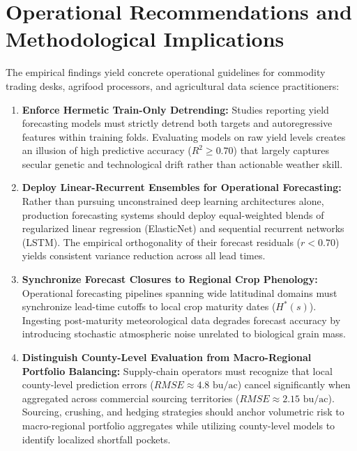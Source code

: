 \section{Operational Recommendations and Methodological Implications}
\label{sec:disc_recommendations}

The empirical findings yield concrete operational guidelines for commodity trading desks, agrifood processors, and agricultural data science practitioners:

\begin{enumerate}
    \item \textbf{Enforce Hermetic Train-Only Detrending:} Studies reporting yield forecasting models must strictly detrend both targets and autoregressive features within training folds. Evaluating models on raw yield levels creates an illusion of high predictive accuracy ($R^2 \ge 0.70$) that largely captures secular genetic and technological drift rather than actionable weather skill.
    \item \textbf{Deploy Linear-Recurrent Ensembles for Operational Forecasting:} Rather than pursuing unconstrained deep learning architectures alone, production forecasting systems should deploy equal-weighted blends of regularized linear regression (ElasticNet) and sequential recurrent networks (LSTM). The empirical orthogonality of their forecast residuals ($r < 0.70$) yields consistent variance reduction across all lead times.
    \item \textbf{Synchronize Forecast Closures to Regional Crop Phenology:} Operational forecasting pipelines spanning wide latitudinal domains must synchronize lead-time cutoffs to local crop maturity dates ($H^*(s)$). Ingesting post-maturity meteorological data degrades forecast accuracy by introducing stochastic atmospheric noise unrelated to biological grain mass.
    \item \textbf{Distinguish County-Level Evaluation from Macro-Regional Portfolio Balancing:} Supply-chain operators must recognize that local county-level prediction errors ($RMSE \approx 4.8\text{ bu/ac}$) cancel significantly when aggregated across commercial sourcing territories ($RMSE \approx 2.15\text{ bu/ac}$). Sourcing, crushing, and hedging strategies should anchor volumetric risk to macro-regional portfolio aggregates while utilizing county-level models to identify localized shortfall pockets.
\end{enumerate}


